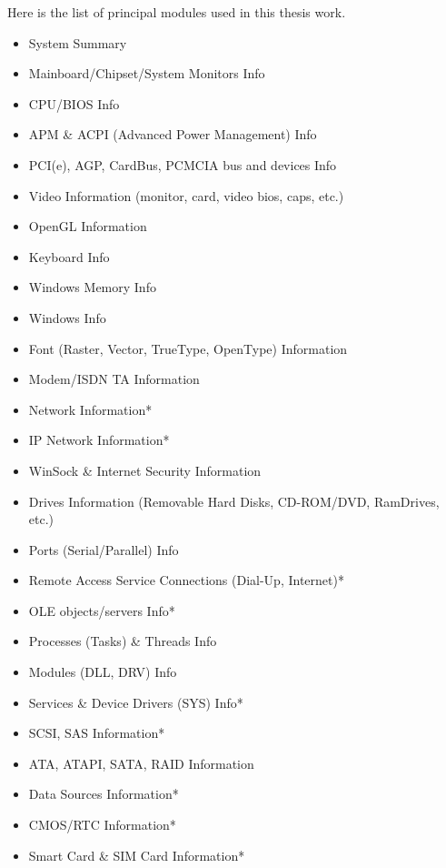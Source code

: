 Here is the list of principal modules used in this thesis work.
\begin{itemize}
    \item System Summary
    \item Mainboard/Chipset/System Monitors Info
    \item CPU/BIOS Info
    \item APM \& ACPI (Advanced Power Management) Info
    \item PCI(e), AGP, CardBus, PCMCIA bus and devices Info
    \item Video Information (monitor, card, video bios, caps, etc.)
    \item OpenGL Information
    \item Keyboard Info
    \item Windows Memory Info
    \item Windows Info
    \item Font (Raster, Vector, TrueType, OpenType) Information
    \item Modem/ISDN TA Information
    \item Network Information*
    \item IP Network Information*
    \item WinSock \& Internet Security Information
    \item Drives Information (Removable Hard Disks, CD-ROM/DVD, RamDrives, etc.)
    \item Ports (Serial/Parallel) Info
    \item Remote Access Service Connections (Dial-Up, Internet)*
    \item OLE objects/servers Info*
    \item Processes (Tasks) \& Threads Info
    \item Modules (DLL, DRV) Info
    \item Services \& Device Drivers (SYS) Info*
    \item SCSI, SAS Information*
    \item ATA, ATAPI, SATA, RAID Information
    \item Data Sources Information*
    \item CMOS/RTC Information*
    \item Smart Card \& SIM Card Information*
\end{itemize}
    
